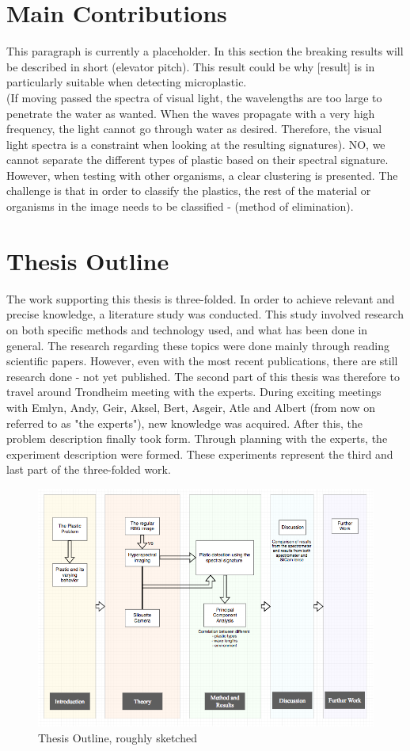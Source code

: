 \section{Main Contributions} This paragraph is currently a placeholder. In this section the breaking results will be described in short (elevator pitch). This result could be why [result] is in particularly suitable when detecting microplastic.
\\
(If moving passed the spectra of visual light, the wavelengths are too large to penetrate the water as wanted. When the waves propagate with a very high frequency, the light cannot go through water as desired. Therefore, the visual light spectra is a constraint when looking at the resulting signatures). NO, we cannot separate the different types of plastic based on their spectral signature. However, when testing with other organisms, a clear clustering is presented. The challenge is that in order to classify the plastics, the rest of the material or organisms in the image needs to be classified - (method of elimination). 

\section{Thesis Outline}
The work supporting this thesis is three-folded. In order to achieve relevant and precise knowledge, a literature study was conducted. This study involved research on both specific methods and technology used, and what has been done in general. The research regarding these topics were done mainly through reading scientific papers. However, even with the most recent publications, there are still research done - not yet published. The second part of this thesis was therefore to travel around Trondheim meeting with the experts. During exciting meetings with Emlyn, Andy, Geir, Aksel, Bert, Asgeir, Atle and Albert (from now on referred to as "the experts"), new knowledge was acquired. After this, the problem description finally took form. Through planning with the experts, the experiment description were formed. These experiments represent the third and last part of the three-folded work. 


\begin{figure}
  \includegraphics[width=\linewidth]{Images/outline.png}
  \caption{Thesis Outline, roughly sketched}
  \label{fig:outline}
\end{figure}

